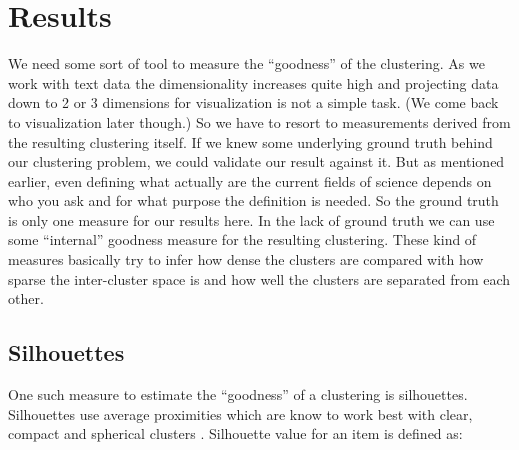 \chapter{Results}
\label{chapter:results}

We need some sort of tool to measure the ``goodness'' of the 
clustering. As we work with text data the dimensionality increases 
quite high and projecting data down to 2 or 3 dimensions for 
visualization is not a simple task. (We come back to visualization 
later though.)
So we have to resort to measurements derived from the 
resulting clustering itself. If we knew some underlying ground 
truth behind our clustering problem, we could validate our result 
against it. But as mentioned earlier, even defining what actually 
are the current fields of science depends on who you ask and for 
what purpose the definition is needed. So the ground truth is only
one measure for our results here.
In the lack of ground truth we can use some ``internal'' goodness 
measure for the resulting clustering. These kind of measures 
basically try to infer how dense the clusters are compared with how 
sparse the inter-cluster space is and how well the clusters are 
separated from each other.

\section{Silhouettes}
One such measure to estimate the ``goodness'' of a clustering is 
silhouettes. Silhouettes use average proximities which are know 
to work best with clear, compact and spherical clusters 
\cite{rousseeuw_silhouettes:_1987}. Silhouette value for an item 
is defined as:

